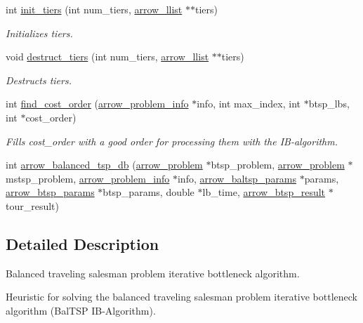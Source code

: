 \begin{CompactItemize}
int \hyperlink{lib_2baltsp_2baltsp-db_8c_05a2ff158dd6edc613a6623787c04a31}{init\_\-tiers} (int num\_\-tiers, \hyperlink{structarrow__llist}{arrow\_\-llist} $\ast$$\ast$tiers)
\begin{CompactList}\small\item\em Initializes tiers. \item\end{CompactList}\item 
void \hyperlink{lib_2baltsp_2baltsp-db_8c_086f8eb237774105f487040ef6ac62df}{destruct\_\-tiers} (int num\_\-tiers, \hyperlink{structarrow__llist}{arrow\_\-llist} $\ast$$\ast$tiers)
\begin{CompactList}\small\item\em Destructs tiers. \item\end{CompactList}\item 
int \hyperlink{lib_2baltsp_2baltsp-db_8c_fe2b4359a26c49fe7602c86021b91ee7}{find\_\-cost\_\-order} (\hyperlink{structarrow__problem__info}{arrow\_\-problem\_\-info} $\ast$info, int max\_\-index, int $\ast$btsp\_\-lbs, int $\ast$cost\_\-order)
\begin{CompactList}\small\item\em Fills cost\_\-order with a good order for processing them with the IB-algorithm. \item\end{CompactList}\item 
int \hyperlink{lib_2baltsp_2baltsp-db_8c_1d70c3ec49bdea00ae8f19b56a441ed4}{arrow\_\-balanced\_\-tsp\_\-db} (\hyperlink{structarrow__problem}{arrow\_\-problem} $\ast$btsp\_\-problem, \hyperlink{structarrow__problem}{arrow\_\-problem} $\ast$mstsp\_\-problem, \hyperlink{structarrow__problem__info}{arrow\_\-problem\_\-info} $\ast$info, \hyperlink{structarrow__baltsp__params}{arrow\_\-baltsp\_\-params} $\ast$params, \hyperlink{structarrow__btsp__params}{arrow\_\-btsp\_\-params} $\ast$btsp\_\-params, double $\ast$lb\_\-time, \hyperlink{structarrow__btsp__result}{arrow\_\-btsp\_\-result} $\ast$tour\_\-result)
\end{CompactItemize}


\subsection{Detailed Description}
Balanced traveling salesman problem iterative bottleneck algorithm. 

Heuristic for solving the balanced traveling salesman problem iterative bottleneck algorithm (BalTSP IB-Algorithm).

